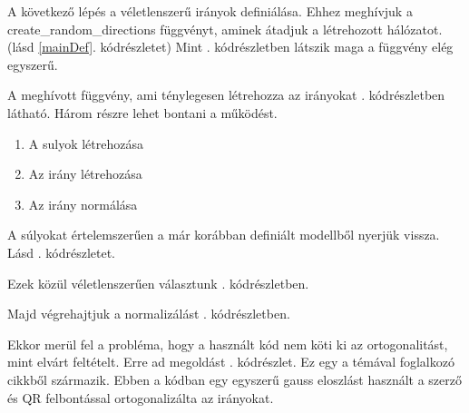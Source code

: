 \documentclass[twoside,a4paper]{refart}
\begin{document}
	A következő lépés a véletlenszerű irányok definiálása. Ehhez meghívjuk a create\_random\_directions függvényt, aminek átadjuk a létrehozott hálózatot.(lásd \ref{mainDef}. kódrészletet) Mint . kódrészletben látszik maga a függvény elég egyszerű.
	
	{\small }
	
	A meghívott függvény, ami ténylegesen létrehozza az irányokat . kódrészletben látható. Három részre lehet bontani a működést.
	\begin{enumerate}
		\item A sulyok létrehozása
		\item Az irány létrehozása
		\item Az irány normálása
	\end{enumerate}
	
	{\small }
	
	A súlyokat értelemszerűen a már korábban definiált modellből nyerjük vissza. Lásd . kódrészletet.
	
	{\small }
	
	Ezek közül véletlenszerűen választunk . kódrészletben.
	
	{\small }
	
	Majd végrehajtjuk a normalizálást . kódrészletben.
	
	{\small }
	
	Ekkor merül fel a probléma, hogy a használt kód nem köti ki az ortogonalitást, mint elvárt feltételt. Erre ad megoldást . kódrészlet. Ez egy a témával foglalkozó cikkből\cite{jae2019VLLoDNN} származik. Ebben a kódban egy egyszerű gauss eloszlást használt a szerző és QR felbontással ortogonalizálta az irányokat.
	
	{\small }
	
\end{document}
